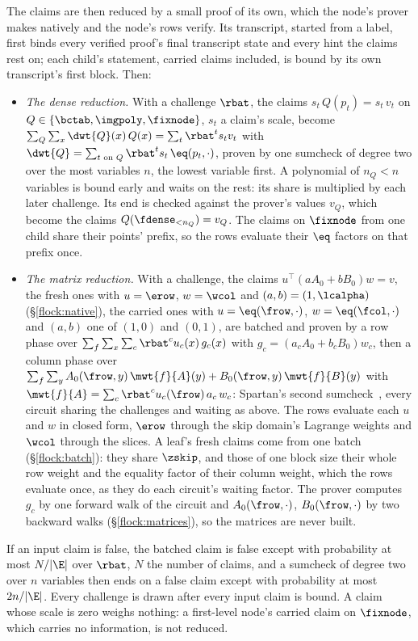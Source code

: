 The claims are then reduced by a small proof of its own, which the node's prover makes natively and the node's rows verify. Its transcript, started from a label, first binds every verified proof's final transcript state and every hint the claims rest on; each child's statement, carried claims included, is bound by its own transcript's first block. Then:
\begin{itemize}[itemsep=1pt,topsep=3pt]
\item \emph{The dense reduction.} With a challenge $\rbat$, the claims $s_t\,Q(p_t)=s_t\,v_t$ on $Q\in\{\bctab,\imgpoly,\fixnode\}$, $s_t$ a claim's scale, become $\sum_Q\sum_x\dwt{Q}(x)\,Q(x)=\sum_t\rbat^t s_tv_t$ with $\dwt{Q}=\sum_{t\text{ on }Q}\rbat^t s_t\,\eq(p_t,\cdot)$, proven by one sumcheck of degree two over the most variables $n$, the lowest variable first. A polynomial of $n_Q<n$ variables is bound early and waits on the rest: its share is multiplied by each later challenge. Its end is checked against the prover's values $v_Q$, which become the claims $Q({\fdense}_{<n_Q})=v_Q$. The claims on $\fixnode$ from one child share their points' prefix, so the rows evaluate their $\eq$ factors on that prefix once.
\item \emph{The matrix reduction.} With a challenge, the claims $u^{\top}(aA_0+bB_0)w=v$, the fresh ones with $u=\erow$, $w=\wcol$ and $(a,b)=(1,\lcalpha)$ (\S\ref{flock:native}), the carried ones with $u=\eq(\frow,\cdot)$, $w=\eq(\fcol,\cdot)$ and $(a,b)$ one of $(1,0)$ and $(0,1)$, are batched and proven by a row phase over $\sum_f\sum_x\sum_c\rbat^cu_c(x)\,g_c(x)$ with $g_c=(a_cA_0+b_cB_0)w_c$, then a column phase over $\sum_f\sum_y A_0(\frow,y)\,\mwt{f}{A}(y)+B_0(\frow,y)\,\mwt{f}{B}(y)$ with $\mwt{f}{A}=\sum_c\rbat^cu_c(\frow)\,a_c\,w_c$: Spartan's second sumcheck~\cite{Set20}, every circuit sharing the challenges and waiting as above. The rows evaluate each $u$ and $w$ in closed form, $\erow$ through the skip domain's Lagrange weights and $\wcol$ through the slices. A leaf's fresh claims come from one batch (\S\ref{flock:batch}): they share $\zskip$, and those of one block size their whole row weight and the equality factor of their column weight, which the rows evaluate once, as they do each circuit's waiting factor. The prover computes $g_c$ by one forward walk of the circuit and $A_0(\frow,\cdot)$, $B_0(\frow,\cdot)$ by two backward walks (\S\ref{flock:matrices}), so the matrices are never built.
\end{itemize}
If an input claim is false, the batched claim is false except with probability at most $N/|\E|$ over $\rbat$, $N$ the number of claims, and a sumcheck of degree two over $n$ variables then ends on a false claim except with probability at most $2n/|\E|$. Every challenge is drawn after every input claim is bound. A claim whose scale is zero weighs nothing: a first-level node's carried claim on $\fixnode$, which carries no information, is not reduced.

